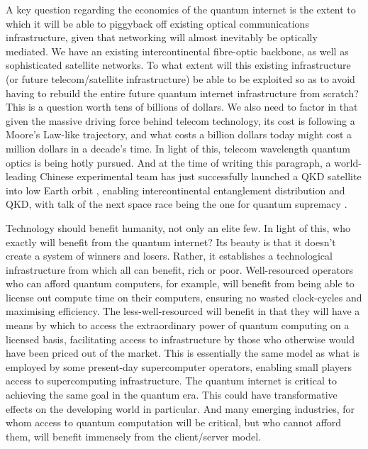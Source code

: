 \documentclass[aps,rmp,twocolumn,amsmath,amssymb,nofootinbib,superscriptaddress,longbibliography,floatfix,table-of-contents,eqsecnum]{revtex4-1}
\begin{document}
A key question regarding the economics of the quantum internet is the extent to which it will be able to piggyback off existing optical communications infrastructure, given that networking will almost inevitably be optically mediated. We have an existing intercontinental fibre-optic backbone, as well as sophisticated satellite networks. To what extent will this existing infrastructure (or future telecom/satellite infrastructure) be able to be exploited so as to avoid having to rebuild the entire future quantum internet infrastructure from scratch? This is a question worth tens of billions of dollars. We also need to factor in that given the massive driving force behind telecom technology, its cost is following a Moore's Law-like trajectory, and what costs a billion dollars today might cost a million dollars in a decade's time. In light of this, telecom wavelength quantum optics is being hotly pursued. And at the time of writing this paragraph, a world-leading Chinese experimental team has just successfully launched a QKD satellite into low Earth orbit \cite{???}, enabling intercontinental entanglement distribution and QKD, with talk of the next space race being the one for quantum supremacy \cite{???}.

Technology should benefit humanity, not only an elite few. In light of this, who exactly will benefit from the quantum internet? Its beauty is that it doesn't create a system of winners and losers. Rather, it establishes a technological infrastructure from which all can benefit, rich or poor. Well-resourced operators who can afford quantum computers, for example, will benefit from being able to license out compute time on their computers, ensuring no wasted clock-cycles and maximising efficiency. The less-well-resourced will benefit in that they will have a means by which to access the extraordinary power of quantum computing on a licensed basis, facilitating access to infrastructure by those who otherwise would have been priced out of the market. This is essentially the same model as what is employed by some present-day supercomputer operators, enabling small players access to supercomputing infrastructure. The quantum internet is critical to achieving the same goal in the quantum era. This could have transformative effects on the developing world in particular. And many emerging industries, for whom access to quantum computation will be critical, but who cannot afford them, will benefit immensely from the client/server model.
\end{document}

